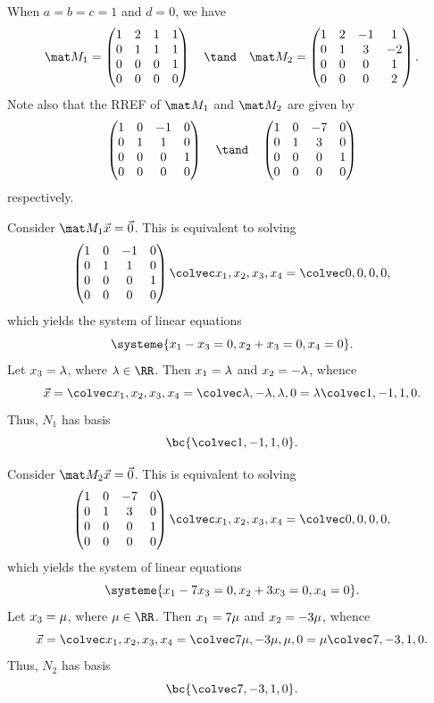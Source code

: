 \begin{solution}
    \begin{ppart}
        When $a = b = c = 1$ and $d = 0$, we have \[\mat M_1 = \begin{pmatrix}1 & 2 & 1 & 1 \\ 0 & 1 & 1 & 1 \\ 0 & 0 & 0 & 1 \\ 0 & 0 & 0 & 0\end{pmatrix} \quad \tand \quad \mat M_2 = \begin{pmatrix} 1 & 2 & -1 & 1 \\ 0 & 1 & 3 & -2 \\ 0 & 0 & 0 & 1 \\ 0 & 0 & 0 & 2 \end{pmatrix}.\] Note also that the RREF of $\mat M_1$ and $\mat M_2$ are given by \[\begin{pmatrix}1 & 0 & -1 & 0 \\ 0 & 1 & 1 & 0 \\ 0 & 0 & 0 & 1 \\ 0 & 0 & 0 & 0\end{pmatrix} \quad \tand \quad \begin{pmatrix}1 & 0 & -7 & 0 \\ 0 & 1 & 3 & 0 \\ 0 & 0 & 0 & 1 \\ 0 & 0 & 0 & 0\end{pmatrix}\] respectively.

        Consider $\mat M_1 \vec x = \vec 0$. This is equivalent to solving \[\begin{pmatrix}1 & 0 & -1 & 0 \\ 0 & 1 & 1 & 0 \\ 0 & 0 & 0 & 1 \\ 0 & 0 & 0 & 0\end{pmatrix} \cveciv{x_1}{x_2}{x_3}{x_4} = \cveciv0000,\] which yields the system of linear equations \[\systeme{x_1 - x_3 = 0, x_2 + x_3 = 0, x_4 = 0}.\] Let $x_3 = \lambda$, where $\l \in \RR$. Then $x_1 = \lambda$ and $x_2 = -\lambda$, whence \[\vec x = \cveciv{x_1}{x_2}{x_3}{x_4} = \cveciv{\l}{-\l}{\l}{0} = \l \cveciv{1}{-1}{1}{0}.\] Thus, $N_1$ has basis \[\bc{\cveciv1{-1}10}.\]

        Consider $\mat M_2 \vec x = \vec 0$. This is equivalent to solving \[\begin{pmatrix}1 & 0 & -7 & 0 \\ 0 & 1 & 3 & 0 \\ 0 & 0 & 0 & 1 \\ 0 & 0 & 0 & 0\end{pmatrix} \cveciv{x_1}{x_2}{x_3}{x_4} = \cveciv0000,\] which yields the system of linear equations \[\systeme{x_1 - 7x_3 = 0, x_2 + 3x_3 = 0, x_4 = 0}.\] Let $x_3 = \mu$, where $\m \in \RR$. Then $x_1 = 7\mu$ and $x_2 = -3\mu$, whence \[\vec x = \cveciv{x_1}{x_2}{x_3}{x_4} = \cveciv{7\m}{-3\m}{\m}{0} = \m \cveciv{7}{-3}{1}{0}.\] Thus, $N_2$ has basis \[\bc{\cveciv{7}{-3}{1}{0}}.\]


\end{ppart}
\end{solution}
